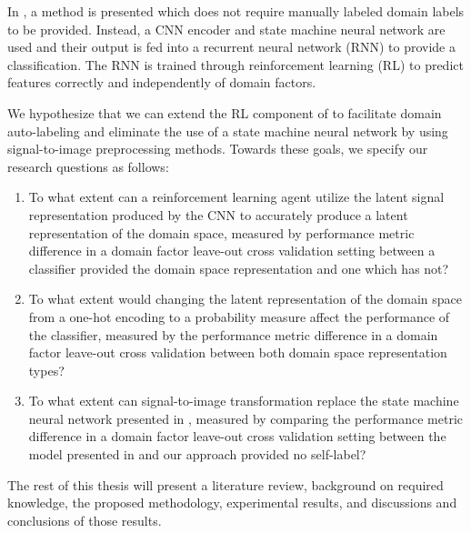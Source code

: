 In \cite{ma2021location}, a method is presented which does not require manually labeled domain labels to be provided.
Instead, a CNN encoder and state machine neural network are used and their output is fed into a recurrent neural network (RNN) to provide a classification.
The RNN is trained through reinforcement learning (RL) to predict features correctly and independently of domain factors.

We hypothesize that we can extend the RL component of \cite{ma2021location} to facilitate domain auto-labeling and eliminate the use of a state machine neural network by using signal-to-image preprocessing methods.
Towards these goals, we specify our research questions as follows:

\begin{enumerate}
	\item To what extent can a reinforcement learning agent utilize the latent signal representation produced by the CNN to accurately produce a latent representation of the domain space, measured by performance metric difference in a domain factor leave-out cross validation setting between a classifier provided the domain space representation and one which has not?
	\item To what extent would changing the latent representation of the domain space from a one-hot encoding to a probability measure affect the performance of the classifier, measured by the performance metric difference in a domain factor leave-out cross validation between both domain space representation types?
	\item To what extent can signal-to-image transformation replace the state machine neural network presented in \cite{ma2021location}, measured by comparing the performance metric difference in a domain factor leave-out cross validation setting between the model presented in \cite{ma2021location} and our approach provided no self-label?
\end{enumerate}

The rest of this thesis will present a literature review, background on required knowledge, the proposed methodology, experimental results, and discussions and conclusions of those results.